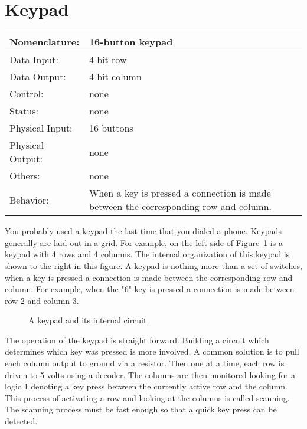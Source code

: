 \section{Keypad}
\label{page:keypad}
\begin{tabular}{|l|p{3.5in}|} \hline
Nomenclature:  & 16-button keypad                           \\ \hline
Data Input:    & 4-bit row        \\ \hline
Data Output:   & 4-bit column   \\ \hline
Control:       & none           \\ \hline
Status:        & none                                   \\ \hline
Physical Input:& 16 buttons		\\ \hline
Physical Output:& none		\\ \hline
Others:        & none                   \\ \hline
Behavior:      & When a key is pressed a connection is made between
the corresponding row and column. \\ \hline
\end{tabular}

You probably used a keypad the last time that you dialed a phone.
Keypads generally are laid out in a grid.
For example, on the left side of Figure~\ref{fig:commonPeripheralComponentskeypad} 
is a keypad with 4 rows and 4 columns.  The internal organization
of this keypad is shown to the right in this figure.  A keypad is
nothing more than a set of switches, when a key is pressed a connection
is made between the corresponding row and column.  For example, when
the "6" key is pressed a connection is made between row 2 and column
3.

\begin{figure}[ht]
\caption{A keypad and its internal circuit.}
\label{fig:commonPeripheralComponentskeypad}
\end{figure}

The operation of the keypad is straight forward.  Building a circuit
which determines which key was pressed is more involved.   A common
solution is to pull each column output to ground via a resistor.  Then
one at a time, each row is driven to 5 volts using a decoder.  The
columns are then monitored looking for a logic 1 denoting a key press
between the currently active row and the column.  This process
of activating a row and looking at the columns is called scanning.  The
scanning process must be fast enough so that a quick key press can be 
detected.

